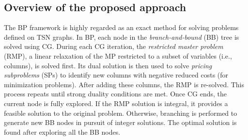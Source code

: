 \documentclass[12pt]{article}
\begin{document}



\subsection{Overview of the proposed approach}\label{sec41}
The BP framework is highly regarded as an exact method for solving problems defined on TSN graphs. In BP, each node in the \textit{branch-and-bound} (BB) tree is solved using CG. During each CG iteration, the \textit{restricted master problem} (RMP), a linear relaxation of the MP restricted to a subset of variables (i.e., columns), is solved first. Its dual solution is then used to solve \textit{pricing subproblems} (SPs) to identify new columns with negative reduced costs (for minimization problems). After adding these columns, the RMP is re-solved. This process repeats until strong duality conditions are met. Once CG ends, the current node is fully explored. If the RMP solution is integral, it provides a feasible solution to the original problem. Otherwise, branching is performed to generate new BB nodes in pursuit of integer solutions. The optimal solution is found after exploring all the BB nodes.


\end{document}
